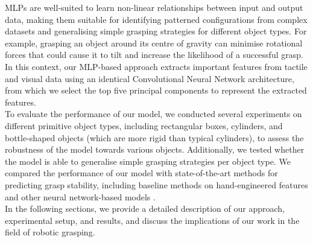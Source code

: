 \documentclass[11pt, a4paper]{report}
\begin{document}
MLPs are well-suited to learn non-linear relationships between input and output data, making them suitable for identifying patterned configurations from complex datasets and generalising simple grasping strategies for different object types. For example, grasping an object around its centre of gravity can minimise rotational forces that could cause it to tilt and increase the likelihood of a successful grasp. In this context, our MLP-based approach extracts important features from tactile and visual data using an identical Convolutional Neural Network architecture, from which we select the top five principal components to represent the extracted features.\\

To evaluate the performance of our model, we conducted several experiments on different primitive object types, including rectangular boxes, cylinders, and bottle-shaped objects (which are more rigid than typical cylinders), to assess the robustness of the model towards various objects. Additionally, we tested whether the model is able to generalise simple grasping strategies per object type. We compared the performance of our model with state-of-the-art methods for predicting grasp stability, including baseline methods on hand-engineered features and other neural network-based models \cite{mahler2017dexnet, pinto2015supersizing}.\\

In the following sections, we provide a detailed description of our approach, experimental setup, and results, and discuss the implications of our work in the field of robotic grasping.
\end{document}
